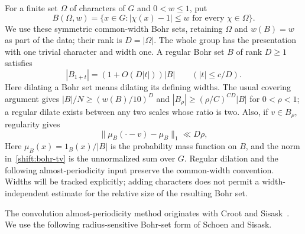 For a finite set $\Omega$ of characters of $G$ and $0<w\le1$, put
\[
 B(\Omega,w)=\{x\in G:|\chi(x)-1|\le w\text{ for every }\chi\in\Omega\}.
\]
We use these symmetric common-width Bohr sets, retaining $\Omega$ and
$w(B)=w$ as part of the data; their rank is $D=|\Omega|$.
The whole group has the presentation with one trivial character and
width one.  A regular Bohr set $B$ of rank $D\geq1$
satisfies
\[
 |B_{1+t}|=(1+O(D|t|))|B|\qquad (|t|\leq c/D).
\]
Here dilating a Bohr set means dilating its defining widths.
The usual covering argument gives
$|B|/N\geq(w(B)/10)^D$ and
$|B_\rho|\geq(\rho/C)^{CD}|B|$ for $0<\rho<1$; a regular
dilate exists between any two scales whose ratio is two.
Also, if $v\in B_\rho$, regularity gives
\begin{equation}\label{shift:bohr-tv}
 \|\mu_B(\cdot-v)-\mu_B\|_1\ll D\rho,
\end{equation}
Here $\mu_B(x)=1_B(x)/|B|$ is the probability mass function on $B$,
and the norm in~\eqref{shift:bohr-tv} is the unnormalized sum over $G$.
Regular dilation and the following almost-periodicity input preserve
the common-width convention.  Widths will be tracked explicitly;
adding characters does not permit a width-independent estimate for
the relative size of the resulting Bohr set.

The convolution almost-periodicity method originates with Croot and
Sisask~\cite{CrootSisask2010}. We use the following radius-sensitive
Bohr-set form of Schoen and Sisask.

